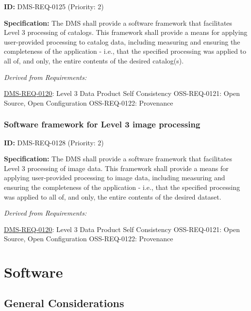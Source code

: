 \documentclass[SE,toc,lsstdraft]{lsstdoc}
\begin{document}
\label{DMS-REQ-0125}
\textbf{ID:} DMS-REQ-0125 (Priority: 2)

\textbf{Specification:} The DMS shall provide a software framework that facilitates Level 3 processing of catalogs.  This framework shall provide a means for applying user-provided processing to catalog data, including measuring and ensuring the completeness of the application - i.e., that the specified processing was applied to all of, and only, the entire contents of the desired catalog(s).

\emph{Derived from Requirements:}

\hyperref[DMS-REQ-0120]{DMS-REQ-0120}:
Level 3 Data Product Self Consistency \newline
OSS-REQ-0121:
Open Source, Open Configuration \newline
OSS-REQ-0122:
Provenance \newline

\subsubsection{Software framework for Level 3 image processing}

\label{DMS-REQ-0128}
\textbf{ID:} DMS-REQ-0128 (Priority: 2)

\textbf{Specification:} The DMS shall provide a software framework that facilitates Level 3 processing of image data.  This framework shall provide a means for applying user-provided processing to image data, including measuring and ensuring the completeness of the application - i.e., that the specified processing was applied to all of, and only, the entire contents of the desired dataset.

\emph{Derived from Requirements:}

\hyperref[DMS-REQ-0120]{DMS-REQ-0120}:
Level 3 Data Product Self Consistency \newline
OSS-REQ-0121:
Open Source, Open Configuration \newline
OSS-REQ-0122:
Provenance \newline

\section{Software}

\subsection{General Considerations}
\end{document}
